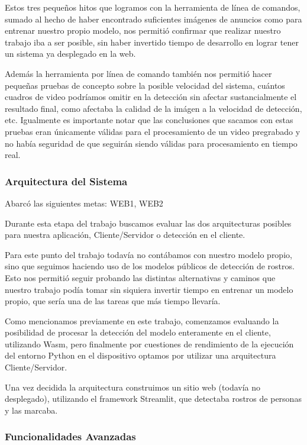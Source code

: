 \documentclass[a4paper]{article}
\begin{document}
Estos tres pequeños hitos que logramos con la herramienta de línea de comandos, sumado al hecho de haber encontrado suficientes imágenes de anuncios como para entrenar nuestro propio modelo, nos permitió confirmar que realizar nuestro trabajo iba a ser posible, sin haber invertido tiempo de desarrollo en lograr tener un sistema ya desplegado en la web.

Además la herramienta por línea de comando también nos permitió hacer pequeñas pruebas de concepto sobre la posible velocidad del sistema, cuántos cuadros de video podríamos omitir en la detección sin afectar sustancialmente el resultado final, como afectaba la calidad de la imágen a la velocidad de detección, etc. Igualmente es importante notar que las conclusiones que sacamos con estas pruebas eran únicamente válidas para el procesamiento de un video pregrabado y no había seguridad de que seguirán siendo válidas para procesamiento en tiempo real.

\subsubsection{Arquitectura del Sistema}

Abarcó las siguientes metas: WEB1, WEB2

Durante esta etapa del trabajo buscamos evaluar las dos arquitecturas posibles para nuestra aplicación, Cliente/Servidor o detección en el cliente.

Para este punto del trabajo todavía no contábamos con nuestro modelo propio, sino que seguimos haciendo uso de los modelos públicos de detección de rostros. Esto nos permitió seguir probando las distintas alternativas y caminos que nuestro trabajo podía tomar sin siquiera invertir tiempo en entrenar un modelo propio, que sería una de las tareas que más tiempo llevaría.

Como mencionamos previamente en este trabajo, comenzamos evaluando la posibilidad de procesar la detección del modelo enteramente en el cliente, utilizando Wasm, pero finalmente por cuestiones de rendimiento de la ejecución del entorno Python en el dispositivo optamos por utilizar una arquitectura Cliente/Servidor.

Una vez decidida la arquitectura construimos un sitio web (todavía no desplegado), utilizando el framework Streamlit, que detectaba rostros de personas y las marcaba.

\subsubsection{Funcionalidades Avanzadas}
\end{document}
